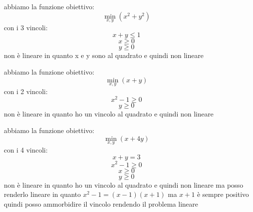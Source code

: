\message{ !name(ro.tex)}\documentclass[a4paper,12pt, oneside]{book}
\begin{document}
\begin{esempio}
  abbiamo la funzione obiettivo:
  \[\min_{x,y}(x^2+y^2)\]
  con i 3 vincoli:
  \[x+y\leq 1\]
  \[x\geq 0\]
  \[y\geq 0\]
  non è lineare in quanto x e y sono al quadrato e quindi non lineare
\end{esempio}
\begin{esempio}
  abbiamo la funzione obiettivo:
  \[\min_{x,y}(x+y)\]
  con i 2 vincoli:
  \[x^2-1\geq 0\]
  \[y\geq 0\]
  non è lineare in quanto ho un vincolo al quadrato e quindi non
  lineare 
\end{esempio}
\begin{esempio}
  abbiamo la funzione obiettivo:
  \[\min_{x,y}(x+4y)\]
  con i 4 vincoli:
  \[x+y=3\]
  \[x^2-1\geq 0\]
  \[x\geq 0\]
  \[y\geq 0\]
  non è lineare in quanto ho un vincolo al quadrato e quindi non
  lineare ma posso renderlo lineare in quanto $x^2-1=(x-1)(x+1)$ ma
  $x+1$ è sempre positivo quindi posso ammorbidire il vincolo
  rendendo il problema lineare
\end{esempio}
\end{document}
